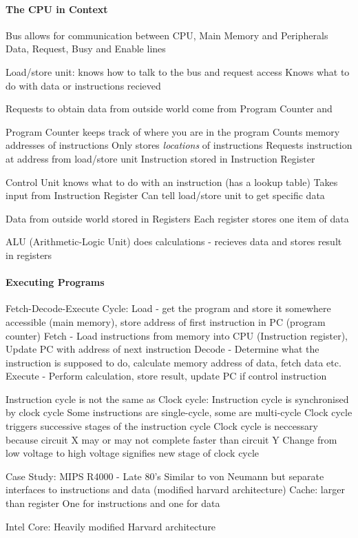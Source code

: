 \documentclass{article}
\begin{document}
\paragraph{The CPU in Context}
Bus allows for communication between CPU, Main Memory and Peripherals
Data, Request, Busy and Enable lines

Load/store unit: knows how to talk to the bus and request access
Knows what to do with data or instructions recieved

Requests to obtain data from outside world come from Program Counter and

Program Counter keeps track of where you are in the program
Counts memory addresses of instructions
Only stores \textit{locations} of instructions
Requests instruction at address from load/store unit
Instruction stored in Instruction Register

Control Unit knows what to do with an instruction (has a lookup table)
Takes input from Instruction Register
Can tell load/store unit to get specific data

Data from outside world stored in Registers
Each register stores one item of data

ALU (Arithmetic-Logic Unit) does calculations - recieves data and stores result in registers

\paragraph{Executing Programs}
Fetch-Decode-Execute Cycle:
Load - get the program and store it somewhere accessible (main memory), store address of first instruction in PC (program counter)
Fetch - Load instructions from memory into CPU (Instruction register), Update PC with address of next instruction
Decode - Determine what the instruction is supposed to do, calculate memory address of data, fetch data etc.
Execute - Perform calculation, store result, update PC if control instruction

Instruction cycle is not the same as Clock cycle:
Instruction cycle is synchronised by clock cycle
Some instructions are single-cycle, some are multi-cycle
Clock cycle triggers successive stages of the instruction cycle
Clock cycle is neccessary because circuit X may or may not complete faster than circuit Y
Change from low voltage to high voltage signifies new stage of clock cycle

Case Study: MIPS R4000 - Late 80's
Similar to von Neumann but separate interfaces to instructions and data (modified harvard architecture)
Cache: larger than register
One for instructions and one for data

Intel Core: Heavily modified Harvard architecture
\end{document}
